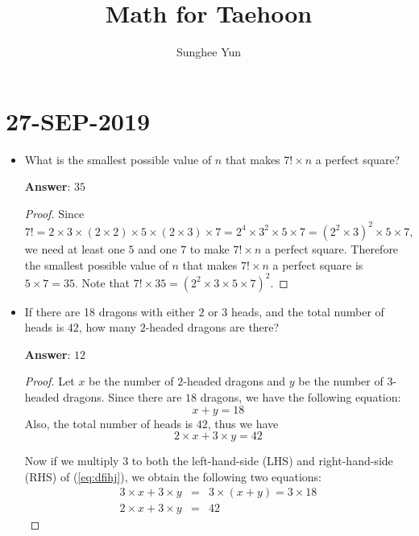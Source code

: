 \documentclass{article}
\title{Math for Taehoon}
\author{Sunghee Yun}
\begin{document}
\maketitle

\tableofcontents

\newpage

\section{27-SEP-2019}
\begin{itemize}
\item What is the smallest possible value of $n$ that makes $7! \times n$ a perfect square?

{\bf Answer}: $35$

\begin{proof}
Since
\begin{equation}
7! = 2 \times 3 \times (2 \times 2 ) \times 5 \times (2\times 3) \times 7
= 2^4 \times 3^2 \times 5 \times 7
= (2^2 \times 3)^2 \times 5 \times 7,
\end{equation}
we need at least one $5$ and one $7$ to make $7!\times n$ a perfect square.
Therefore the smallest possible value of $n$ that makes $7! \times n$ a perfect square
is $5\times 7 = 35$.
Note that $7! \times 35 = (2^2 \times 3 \times 5 \times 7)^2$.

\end{proof}

\item If there are 18 dragons with either $2$ or $3$ heads,
and the total number of heads is $42$,
how many $2$-headed dragons are there? 

{\bf Answer}: $12$

\begin{proof}
Let $x$ be the number of $2$-headed dragons
and
$y$ be the number of $3$-headed dragons.
Since there are $18$ dragons, we have the following equation:
\begin{equation}
\label{eq:dfihj}
x + y = 18
\end{equation}
Also, the total number of heads is $42$, thus we have
\begin{equation}
2 \times x + 3 \times y = 42
\end{equation}

Now if we multiply $3$ to both the left-hand-side (LHS) and right-hand-side (RHS) of (\ref{eq:dfihj}),
we obtain the following two equations:
\begin{eqnarray}
3\times x + 3\times y &=& 3\times(x+y) = 3\times 18
\label{eq:oges}
\\
2 \times x + 3 \times y &=& 42
\label{eq:uydh}
\end{eqnarray}


\end{proof}
\end{itemize}
\end{document}
